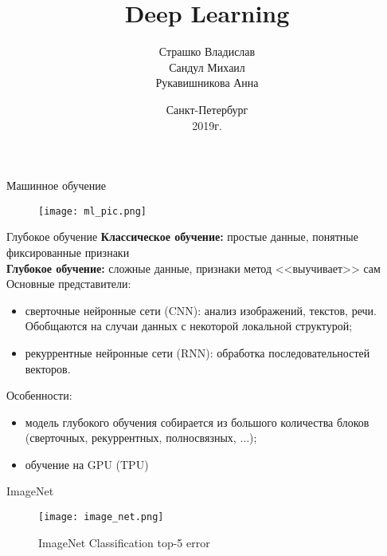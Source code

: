 \documentclass[unicode,9pt, pdf]{beamer}
\title[Deep Learning]{Deep Learning}
\author[Страшко В., Сандул М., Рукавишникова А.]{Страшко Владислав \\
        Сандул Михаил \\
        Рукавишникова Анна}
\date{
	Санкт-Петербург\\
	2019г.
}
\begin{document}
	
	\begin{frame}
		\titlepage
	\end{frame}
	
	\begin{frame}{Машинное обучение}
	    \begin{figure}[h]
	        \begin{center}
		        \texttt{[image: ml\_pic.png]}
	        \end{center}
        \end{figure}
	\end{frame}
	
	\begin{frame}{Глубокое обучение}
    \textbf{Классическое обучение:} простые данные, понятные фиксированные признаки\\
    
    \textbf{Глубокое обучение:} сложные данные, признаки метод <<выучивает>> сам\\
    \vspace{0.5cm}
	Основные представители:
        \begin{itemize}
            \item  сверточные нейронные сети (CNN): анализ изображений, текстов, речи. Обобщаются на случаи данных с некоторой локальной структурой;
            \item рекуррентные нейронные сети (RNN): обработка последовательностей векторов.
        \end{itemize}
    \vspace{0.5cm}
    Особенности:
    \begin{itemize}
        \item модель глубокого обучения собирается из большого количества блоков (сверточных, рекуррентных, полносвязных, $\ldots$);
        \item обучение на GPU (TPU)
    \end{itemize}
        
	\end{frame}
	
	\begin{frame}{ImageNet}
	    \begin{figure}
	        \centering
	        \texttt{[image: image\_net.png]}
	        \caption{ImageNet Classification top-5 error}
	        \label{fig:my_label}
	    \end{figure}
	\end{frame}
	
\end{document}
